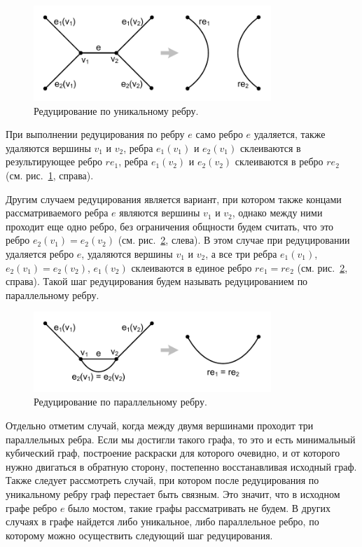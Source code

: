 \begin{figure}[ht]
\centering
\includegraphics[width=0.8\textwidth]{./pics/text_3_edge_coloring/1-pic-reduce-edge-type-1.pdf}
\singlespacing
{}\caption{Редуцирование по уникальному ребру.}
\label{fig:text_3_edge_coloring_1}
\end{figure}

При выполнении редуцирования по ребру $e$ само ребро $e$ удаляется, также удаляются вершины $v_1$ и $v_2$, ребра $e_1(v_1)$ и $e_2(v_1)$ склеиваются в результирующее ребро $re_1$, ребра $e_1(v_2)$ и $e_2(v_2)$ склеиваются в ребро $re_2$ (см. рис.~\ref{fig:text_3_edge_coloring_1}, справа).

Другим случаем редуцирования является вариант, при котором также концами рассматриваемого ребра $e$ являются вершины $v_1$ и $v_2$, однако между ними проходит еще одно ребро, без ограничения общности будем считать, что это ребро $e_2(v_1) = e_2(v_2)$ (см. рис.~\ref{fig:text_3_edge_coloring_2}, слева).
В этом случае при редуцировании удаляется ребро $e$, удаляются вершины $v_1$ и $v_2$, а все три ребра $e_1(v_1)$, $e_2(v_1) = e_2(v_2)$, $e_1(v_2)$ склеиваются в единое ребро $re_1 = re_2$ (см. рис.~\ref{fig:text_3_edge_coloring_2}, справа).
Такой шаг редуцирования будем называть редуцированием по параллельному ребру.

\begin{figure}[ht]
\centering
\includegraphics[width=0.8\textwidth]{./pics/text_3_edge_coloring/2-pic-reduce-edge-type-2.pdf}
\singlespacing
{}\caption{Редуцирование по параллельному ребру.}
\label{fig:text_3_edge_coloring_2}
\end{figure}

Отдельно отметим случай, когда между двумя вершинами проходит три параллельных ребра.
Если мы достигли такого графа, то это и есть минимальный кубический граф, построение раскраски для которого очевидно, и от которого нужно двигаться в обратную сторону, постепенно восстанавливая исходный граф.
Также следует рассмотреть случай, при котором после редуцирования по уникальному ребру граф перестает быть связным.
Это значит, что в исходном графе ребро $e$ было мостом, такие графы рассматривать не будем.
В других случаях в графе найдется либо уникальное, либо параллельное ребро, по которому можно осуществить следующий шаг редуцирования.

